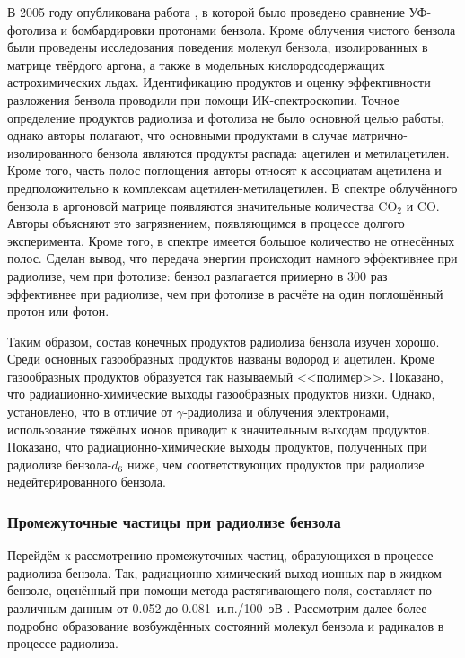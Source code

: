 { В 2005 году опубликована работа \cite{Ruiterkamp2005}, в которой было проведено сравнение УФ-фотолиза и бомбардировки протонами бензола. Кроме облучения чистого бензола 
были проведены исследования поведения молекул бензола, изолированных в матрице твёрдого аргона, а также в модельных кислородсодержащих астрохимических льдах.
Идентификацию продуктов и оценку эффективности разложения бензола проводили при помощи ИК-спектроскопии. Точное определение продуктов радиолиза и фотолиза не было основной целью работы,
однако авторы полагают, что основными продуктами в случае матрично-изолированного бензола являются продукты распада: ацетилен и метилацетилен. 
Кроме того, часть полос поглощения авторы относят к ассоциатам ацетилена и предположительно к комплексам ацетилен-метилацетилен. 
В спектре облучённого бензола в аргоновой матрице появляются значительные количества CO$_2$ и CO. Авторы объясняют это загрязнением, появляющимся в процессе долгого 
эксперимента. Кроме того, в спектре имеется большое количество не отнесённых полос.
 Сделан вывод, что передача энергии происходит намного эффективнее при радиолизе, чем при фотолизе: бензол разлагается примерно в 300 раз эффективнее при радиолизе, чем при фотолизе в расчёте на один
 поглощённый протон или фотон. 

 Таким образом, состав конечных продуктов радиолиза бензола изучен хорошо. Среди основных газообразных продуктов названы водород и ацетилен. Кроме газообразных продуктов образуется так называемый <<полимер>>. Показано, что радиационно-химические выходы газообразных продуктов низки. Однако, установлено, что в отличие от $\gamma$\nobreakdash-радиолиза и облучения электронами,  использование тяжёлых ионов приводит к значительным выходам продуктов. Показано, что радиационно-химические выходы продуктов, полученных при радиолизе бензола-$d_6$ ниже, чем соответствующих продуктов при радиолизе недейтерированного бензола.
 
 \subsubsection{Промежуточные частицы при радиолизе бензола}
 \label{intermediates}
 Перейдём к рассмотрению промежуточных частиц, образующихся в процессе радиолиза бензола. 
 Так, радиационно-химический выход ионных пар в жидком бензоле, оценённый при помощи метода растягивающего поля, составляет по различным данным от 0.052 до 0.081~и.п./100~эВ \cite{Schmidt1968, Schmidt1970, Shinsaka1974}.
 Рассмотрим далее более подробно образование возбуждённых состояний молекул бензола и радикалов в процессе радиолиза.
 
}

